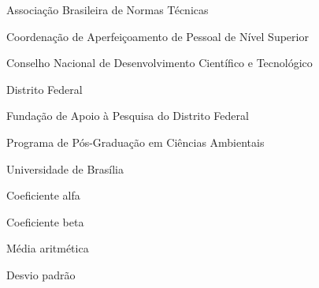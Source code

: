 \documentclass[
  12pt,
  openany,   %
  oneside,   %
  a4paper,
  english, brazil, sumario=tradicional
]{abntex2}
\begin{document}
\begin{siglas}
  \item[ABNT]  Associação Brasileira de Normas Técnicas
  \item[CAPES] Coordenação de Aperfeiçoamento de Pessoal de Nível Superior
  \item[CNPq]  Conselho Nacional de Desenvolvimento Científico e Tecnológico
  \item[DF]    Distrito Federal
  \item[FAPDF] Fundação de Apoio à Pesquisa do Distrito Federal
  \item[PPGCA] Programa de Pós-Graduação em Ciências Ambientais
  \item[UnB]   Universidade de Brasília
\end{siglas}

\begin{simbolos}
  \item[$\alpha$] Coeficiente alfa
  \item[$\beta$]  Coeficiente beta
  \item[$\mu$]    Média aritmética
  \item[$\sigma$] Desvio padrão
\end{simbolos}

\tableofcontents*
\clearpage

\textual
\end{document}
